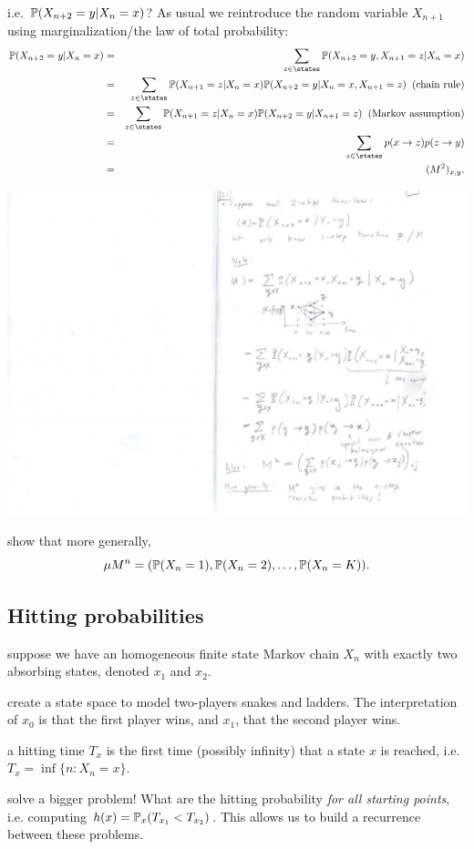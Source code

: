 \documentclass{article}
\begin{document}
 i.e. $\P(X_{n+2} = y | X_n = x)$? As usual we reintroduce the random variable $X_{n+1}$ using marginalization/the law of total probability:
\begin{eqnarray*}
\P(X_{n+2} = y | X_n = x) &=& \sum_{z \in \states} \P(X_{n+2} = y, X_{n+1} = z | X_n = x) \\
&=& \sum_{z \in \states} \P(X_{n+1} = z | X_n = x) \P(X_{n+2} = y | X_n = x, X_{n+1} = z) \;\;(\text{chain rule}) \\
&=& \sum_{z \in \states} \P(X_{n+1} = z | X_n = x) \P(X_{n+2} = y | X_{n+1} = z) \;\;(\text{Markov assumption}) \\
&=& \sum_{z \in \states} p(x \to z) p(z \to y) \\
&=& (M^2)_{x,y}.
\end{eqnarray*} 
\begin{center}
	\includegraphics[width=0.4\linewidth]{figures/kolm-chap} 
\end{center}

 show that more generally, \[\mu M^n = (\P(X_n = 1), \P(X_n = 2), \dots, \P(X_n = K)).\]


\subsection{Hitting probabilities}

 suppose we have an homogeneous finite state Markov chain $X_n$ with exactly two absorbing states, denoted $x_1$ and $x_2$.

 create a state space to model two-players snakes and ladders. The interpretation of $x_0$ is that the first player wins, and $x_1$, that the second player wins. 

 a hitting time $T_x$ is the first time (possibly infinity) that a state $x$ is reached, i.e. $T_x = \inf \{n : X_n = x\}$. 

 solve a bigger problem! What are the hitting probability \emph{for all starting points}, i.e. computing $h(x) = \P_x(T_{x_1} < T_{x_2})$. This allows us to build a recurrence between these problems.
\end{document}
